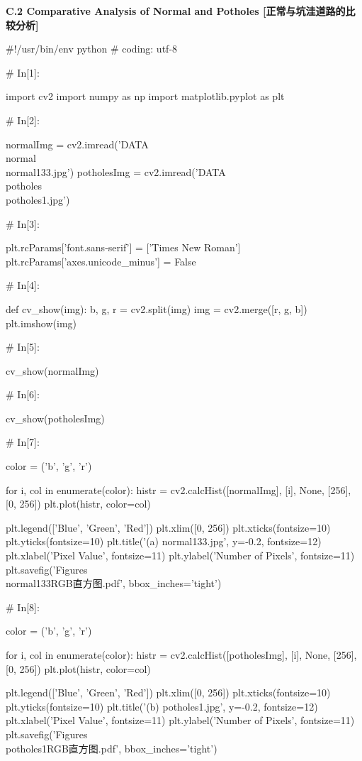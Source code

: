 \documentclass{MathorCupmodeling}
\begin{document}
\textbf{C.2 Comparative Analysis of Normal and Potholes [正常与坑洼道路的比较分析]}
\begin{python}
#!/usr/bin/env python
# coding: utf-8

# In[1]:


import cv2
import numpy as np
import matplotlib.pyplot as plt

# In[2]:


normalImg = cv2.imread('DATA\\normal\\normal133.jpg')
potholesImg = cv2.imread('DATA\\potholes\\potholes1.jpg')

# In[3]:


plt.rcParams['font.sans-serif'] = ['Times New Roman']
plt.rcParams['axes.unicode_minus'] = False


# In[4]:


def cv_show(img):
    b, g, r = cv2.split(img)
    img = cv2.merge([r, g, b])
    plt.imshow(img)


# In[5]:


cv_show(normalImg)

# In[6]:


cv_show(potholesImg)

# In[7]:


color = ('b', 'g', 'r')

for i, col in enumerate(color):
    histr = cv2.calcHist([normalImg], [i], None, [256], [0, 256])
    plt.plot(histr, color=col)

plt.legend(['Blue', 'Green', 'Red'])
plt.xlim([0, 256])
plt.xticks(fontsize=10)
plt.yticks(fontsize=10)
plt.title('(a) normal133.jpg', y=-0.2, fontsize=12)
plt.xlabel('Pixel Value', fontsize=11)
plt.ylabel('Number of Pixels', fontsize=11)
plt.savefig('Figures\\normal133RGB直方图.pdf', bbox_inches='tight')

# In[8]:


color = ('b', 'g', 'r')

for i, col in enumerate(color):
    histr = cv2.calcHist([potholesImg], [i], None, [256], [0, 256])
    plt.plot(histr, color=col)

plt.legend(['Blue', 'Green', 'Red'])
plt.xlim([0, 256])
plt.xticks(fontsize=10)
plt.yticks(fontsize=10)
plt.title('(b) potholes1.jpg', y=-0.2, fontsize=12)
plt.xlabel('Pixel Value', fontsize=11)
plt.ylabel('Number of Pixels', fontsize=11)
plt.savefig('Figures\\potholes1RGB直方图.pdf', bbox_inches='tight')


\end{python}
\end{document}
